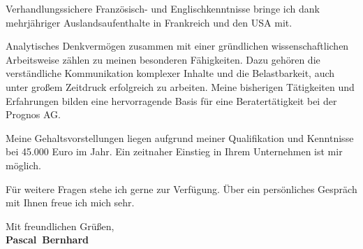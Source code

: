 \documentclass[11pt,a4paper]{article}
\def\firstname{Pascal}
\def\familyname{Bernhard}
\begin{document}
Verhandlungssichere Französisch- und Englischkenntnisse bringe ich dank mehrjähriger Auslandsaufenthalte in Frankreich und den USA mit.

Analytisches Denk­ver­mögen zusammen mit einer gründlichen wissenschaftlichen Arbeitsweise zählen zu meinen besonderen Fähigkeiten. Dazu gehören die verständliche Kommunikation komplexer Inhalte und die Belast­barkeit, auch unter großem Zeitdruck erfolgreich zu arbeiten. Meine bisherigen Tätigkeiten und Erfahrungen bilden eine hervorragende Basis für eine Beratertätigkeit bei der Prognos AG.

Meine Gehaltsvorstellungen liegen aufgrund meiner Qualifikation und Kenntnisse bei 45.000 Euro im Jahr. Ein zeitnaher Einstieg in Ihrem Unternehmen ist mir möglich.


Für weitere Fragen stehe ich gerne zur Verfügung. Über ein persönliches Gespräch mit Ihnen freue ich mich sehr.

  
Mit freundlichen Grüßen,\\[3em] %
%
{\bfseries \firstname~\familyname}\\
%
\end{document}
